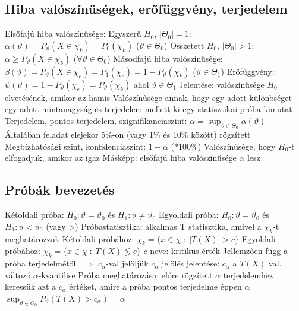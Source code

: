 \documentclass[12pt,a4paper]{article}
\begin{document}
\pagebreak

\subsection{Hiba valószínűségek, erőfüggvény, terjedelem}

\begin{outline}
	\1 Elsőfajú hiba valószínűsége:
		\2 Egyszerű $H_0$, $|\Theta_0| = 1$:
		$\alpha(\vartheta) = P_\vartheta(X \in \chi_k) = P_0(\chi_k)$
		\;\; ($\vartheta \in \Theta_0$)
		\2 Összetett $H_0$, $|\Theta_0| > 1$:
		$\alpha \ge P_\vartheta(X \in \chi_k)$ \;\; ($\forall \vartheta \in \Theta_0$)
	\1 Másodfajú hiba valószínűsége:
	\\$\beta(\vartheta) = P_\vartheta(X \in \chi_e) = P_1(\chi_e)
		= 1 - P_\vartheta(\chi_k)$ \;\; ($\vartheta \in \Theta_1$)
	\1 Erőfüggvény: $\psi(\vartheta) = 1 - P_\vartheta(\chi_e) = P_\vartheta(\chi_k)$
	ahol $\vartheta \in \Theta_1$
		\2 Jelentése: valószínűsége $H_0$ elvetésének, amikor az hamis
		\2 Valószínűsége annak, hogy egy adott különbséget egy adott mintanagyság és terjedelem mellett ki egy statisztikai próba kimutat
	\1 Terjedelem, pontos terjedelem, szignifikanciaszint: $\alpha = \sup_{\vartheta \in \Theta_0} \alpha(\vartheta)$
		\2 Általában feladat elejekor 5\%-on (vagy 1\% és 10\% között) rögzített
		\2 Megbízhatósági szint, konfidenciaszint: $1 - \alpha$ \; ($*100\%$)
			\3 Valószínűsége, hogy $H_0$-t elfogadjuk, amikor az igaz
		\2 Másképp: elsőfajú hiba valószínűsége $\alpha$ lesz
\end{outline}

\subsection{Próbák bevezetés}

\begin{outline}
	\1 Kétoldali próba: $H_0: \vartheta = \vartheta_0$ és $H_1: \vartheta \ne \vartheta_0$
	\1 Egyoldali próba: $H_0: \vartheta = \vartheta_0$ és $H_1: \vartheta < \vartheta_0$ (vagy >)
	\1 Próbastatisztika: alkalmas T statisztika, amivel a $\chi_k$-t meghatározzuk
		\2 Kétoldali próbához: $\chi_k = \{ x \in \chi \;:\; |T(X)| > c \}$
		\2 Egyoldali próbához: $\chi_k = \{ x \in \chi \;:\; T(X) \lessgtr c \}$
		\2 $c$ neve: kritikus érték
			\3 Jellemzően függ a próba terjedelmétől $\implies$ $c_\alpha$-val jelöljük
			\3 $c_\alpha$ jelölés jelentése: $c_\alpha$ a $T(X)$ val. változó $\alpha$-kvantilise
		\2 Próba meghatározása: előre rögzített $\alpha$ terjedelemhez keressük azt a $c_\alpha$ értéket, amire a próba pontos terjedelme éppen $\alpha$
			\3 $\sup_{\vartheta \in \Theta_0} P_\vartheta(T(X) > c_\alpha) = \alpha$
\end{outline}
\end{document}
